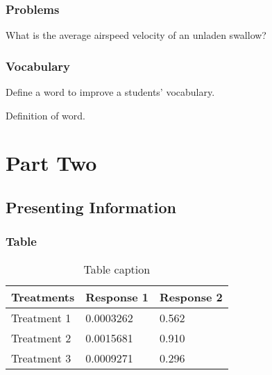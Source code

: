 \documentclass[11pt,fleqn]{book} %
\begin{document}

\section{Problems}

\begin{problem}
What is the average airspeed velocity of an unladen swallow?
\end{problem}


\section{Vocabulary}

Define a word to improve a students' vocabulary.

\begin{vocabulary}[Word]
Definition of word.
\end{vocabulary}


\part{Part Two}



\chapter{Presenting Information}

\section{Table}

\begin{table}[h]
\centering
\begin{tabular}{l l l}
\toprule
\textbf{Treatments} & \textbf{Response 1} & \textbf{Response 2}\\
\midrule
Treatment 1 & 0.0003262 & 0.562 \\
Treatment 2 & 0.0015681 & 0.910 \\
Treatment 3 & 0.0009271 & 0.296 \\
\bottomrule
\end{tabular}
\caption{Table caption}
\label{tab:example} %
\end{table}
\end{document}
